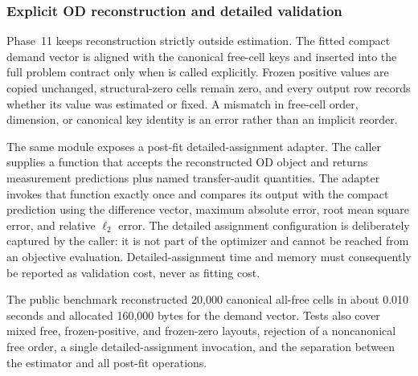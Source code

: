\subsubsection{Explicit OD reconstruction and detailed validation}
\label{sec:reduced-od-reconstruction}

Phase~11 keeps reconstruction strictly outside estimation.  The fitted compact
demand vector is aligned with the canonical free-cell keys and inserted into
the full problem contract only when
 is called
explicitly.  Frozen positive values are copied unchanged, structural-zero
cells remain zero, and every output row records whether its value was estimated
or fixed.  A mismatch in free-cell order, dimension, or canonical key identity
is an error rather than an implicit reorder.

The same module exposes a post-fit detailed-assignment adapter.  The caller
supplies a function that accepts the reconstructed OD object and returns
measurement predictions plus named transfer-audit quantities.  The adapter
invokes that function exactly once and compares its output with the compact
prediction using the difference vector, maximum absolute error, root mean
square error, and relative $\ell_2$ error.  The detailed assignment configuration
is deliberately captured by the caller: it is not part of the optimizer and
cannot be reached from an objective evaluation.  Detailed-assignment time and
memory must consequently be reported as validation cost, never as fitting
cost.

The public benchmark reconstructed 20,000 canonical all-free cells in about
0.010 seconds and allocated 160,000 bytes for the demand vector.  Tests also
cover mixed free, frozen-positive, and frozen-zero layouts, rejection of a
noncanonical free order, a single detailed-assignment invocation, and the
separation between the estimator and all post-fit operations.

